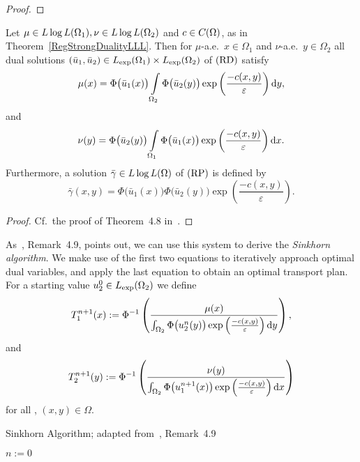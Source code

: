 \begin{proof}
\end{proof}

\begin{corollary}\label{RegOptCond}
	Let $\mu \in \LLL[\Omega_1], \nu \in \LLL[\Omega_2]$ and $c \in \CF{\Omega}$, as in Theorem~\ref{RegStrongDualityLLL}. Then for $\mu$-a.e.\ $x \in \Omega_1$ and $\nu$-a.e.\ $y \in \Omega_2$ all dual solutions $(\bar{u}_1, \bar{u}_2) \in \Lexp[\Omega_1] \times \Lexp[\Omega_2]$ of$\text{\normalfont\ (RD)}$ satisfy
	\[ \mu(x) = \Phi\big( \bar{u}_1(x) \big) \int\limits_{\Omega_2} \Phi\big( \bar{u}_2(y) \big) \exp \left( \frac{- c(x, y)}{\varepsilon} \right)\D[y], \]
	and
	\[ \nu(y) = \Phi\big( \bar{u}_2(y) \big) \int\limits_{\Omega_1} \Phi\big( \bar{u}_1(x) \big) \exp \left( \frac{- c(x, y)}{\varepsilon} \right)\D[x]. \]
	Furthermore, a solution $\bar{\gamma} \in \LLL$ of$\text{\normalfont\ (RP)}$ is defined by
	\[ \bar{\gamma}(x, y) = \Phi\big( \bar{u}_1(x) \big) \Phi\big( \bar{u}_2(y) \big) \exp\left( \frac{- c(x, y)}{\varepsilon} \right). \]
\end{corollary}

\begin{proof}
	Cf.~the proof of Theorem~4.8 in~\cite{Cla2021}.
\end{proof}

As~\cite{Cla2021}, Remark~4.9, points out, we can use this system to derive the \textit{Sinkhorn algorithm}. We make use of the first two equations to iteratively approach optimal dual variables, and apply the last equation to obtain an optimal transport plan. For a starting value $u_2^0 \in \Lexp[\Omega_2]$ we define
\[ T_1^{n + 1}(x) := \Phi^{-1} \left( \frac{\mu(x)}{\int_{\Omega_2} \Phi\big( u_2^n(y) \big) \exp\left( \frac{-c(x, y)}{\varepsilon} \right)\D[y]} \right), \]
and
\[ T_2^{n + 1}(y) := \Phi^{-1} \left( \frac{\nu(y)}{\int_{\Omega_2} \Phi\big( u_1^{n + 1}(x) \big) \exp\left( \frac{-c(x, y)}{\varepsilon} \right)\D[x]} \right) \]
for all \NinN, $(x, y) \in \Omega$.
\begin{algorithm}\label{SinkhornAlg}
	\caption{Sinkhorn Algorithm; adapted from~\cite{Cla2021}, Remark~4.9}
	$n := 0$\;
\end{algorithm}

